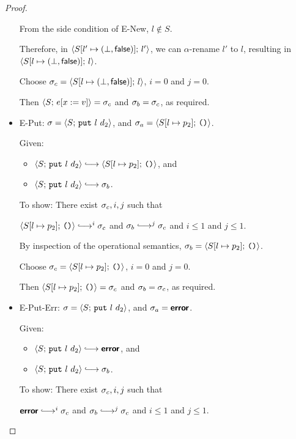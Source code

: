 \begin{proof}
\begin{itemize}
      From the side condition of {\sc E-New}, $l \notin S$.

      Therefore, in $\langle S[l' \mapsto (\bot, \textsf{false})];\, l' \rangle$,
      we can $\alpha$-rename $l'$ to $l$, resulting in
      $\langle S[l \mapsto (\bot, \textsf{false})];\, l \rangle$.

      Choose $\sigma_c = \langle S[l \mapsto (\bot, \textsf{false})];\, l \rangle$,
      $i = 0$ and $j = 0$.

      Then $\langle S;\, e[x := v] \rangle = \sigma_c$ and $\sigma_b =
      \sigma_c$, as required.

    \item {\sc E-Put}: $\sigma = \langle S;\, \mbox{\texttt{put}}~l~d_2 \rangle$, and
      $\sigma_a = \langle S[l \mapsto p_2];\, \mbox{\texttt{()}} \rangle$.

      Given:
      \begin{itemize}
      \item $\config{S}{\putexp{l}{d_2}} \parstepsto
        \config{\extSRaw{S}{l}{p_2}}{\unit}$, and
      \item $\config{S}{\putexp{l}{d_2}} \parstepsto \conf_b$.
      \end{itemize}

      To show: There exist $\sigma_c, i, j$ such that

      $\config{\extSRaw{S}{l}{p_2}}{\unit} \parstepsto^i \conf_c$ and
      $\conf_b \parstepsto^j \conf_c$ and $i \leq 1$ and $j \leq 1$.

      By inspection of the operational semantics, $\sigma_b =
      \langle S[l \mapsto p_2];\, \mbox{\texttt{()}} \rangle$.

      Choose $\sigma_c = \langle S[l \mapsto p_2];\, \mbox{\texttt{()}} \rangle$, $i = 0$
      and $j = 0$.

      Then $\langle S[l \mapsto p_2];\, \mbox{\texttt{()}} \rangle = \sigma_c$ and $\sigma_b
      = \sigma_c$, as required.

    \item {\sc E-Put-Err}: $\sigma = \langle S;\, \mbox{\texttt{put}}~l~d_2 \rangle$, and
      $\sigma_a = \textbf{\textsf{error}}$.

      Given:
      \begin{itemize}
      \item $\config{S}{\putexp{l}{d_2}} \parstepsto \error$, and
      \item $\config{S}{\putexp{l}{d_2}} \parstepsto \conf_b$.
      \end{itemize}

      To show: There exist $\sigma_c, i, j$ such that

      $\error \parstepsto^i \conf_c$ and $\conf_b \parstepsto^j
      \conf_c$ and $i \leq 1$ and $j \leq 1$.


\end{itemize}
\end{proof}
